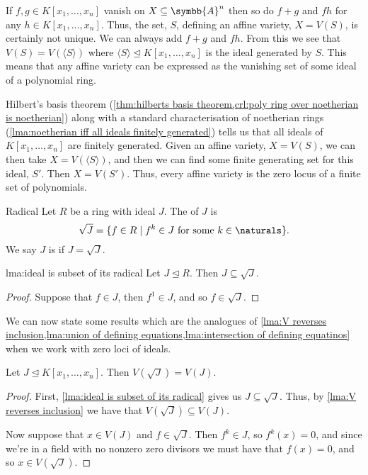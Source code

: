\documentclass[fleqn]{NotesClass}
\newcommand{\subideal}{\trianglelefteq}
\newcommand{\affine}{\symbb{A}}
\begin{document}
    If \(f, g \in K[x_1, \dotsc, x_n]\) vanish on \(X \subseteq \affine^n\) then so do \(f + g\) and \(f h\) for any \(h \in K[x_1, \dotsc, x_n]\).
    Thus, the set, \(S\), defining an affine variety, \(X = V(S)\), is certainly not unique.
    We can always add \(f + g\) and \(fh\).
    From this we see that \(V(S) = V(\langle S \rangle)\) where \(\langle S \rangle \subideal K[x_1, \dotsc, x_n]\) is the ideal generated by \(S\).
    This means that any affine variety can be expressed as the vanishing set of some ideal of a polynomial ring.
    
    Hilbert's basis theorem (\cref{thm:hilberts basis theorem,crl:poly ring over noetherian is noetherian}) along with a standard characterisation of noetherian rings (\cref{lma:noetherian iff all ideals finitely generated}) tells us that all ideals of \(K[x_1, \dotsc, x_n]\) are finitely generated.
    Given an affine variety, \(X = V(S)\), we can then take \(X = V(\langle S \rangle)\), and then we can find some finite generating set for this ideal, \(S'\).
    Then \(X = V(S')\).
    Thus, every affine variety is the zero locus of a finite set of polynomials.
    
    \begin{dfn}{Radical}{}
        Let \(R\) be a ring with ideal \(J\).
        The  of \(J\) is
        \begin{equation}
            \sqrt{J} = \{f \in R \mid f^k \in J \text{ for some } k \in \naturals\}.
        \end{equation}
        We say \(J\) is  if \(J = \sqrt{J}\).
    \end{dfn}
    
    \begin{lma}{}{lma:ideal is subset of its radical}
        Let \(J \subideal R\).
        Then \(J \subseteq \sqrt{J}\).
        \begin{proof}
            Suppose that \(f \in J\), then \(f^1 \in J\), and so \(f \in \sqrt{J}\).
        \end{proof}
    \end{lma}
    
    We can now state some results which are the analogues of \cref{lma:V reverses inclusion,lma:union of defining equations,lma:intersection of defining equatinos} when we work with zero loci of ideals.
    
    \begin{lma}{}{}
        Let \(J \subideal K[x_1, \dotsc, x_n]\).
        Then \(V(\sqrt{J}) = V(J)\).
        \begin{proof}
            First, \cref{lma:ideal is subset of its radical} gives us \(J \subseteq \sqrt{J}\).
            Thus, by \cref{lma:V reverses inclusion} we have that \(V(\sqrt{J}) \subseteq V(J)\).
            
            Now suppose that \(x \in V(J)\) and \(f \in \sqrt{J}\).
            Then \(f^k \in J\), so \(f^k(x) = 0\), and since we're in a field with no nonzero zero divisors we must have that \(f(x) = 0\), and so \(x \in V(\sqrt{J})\).
        \end{proof}
    \end{lma}
    
\end{document}
